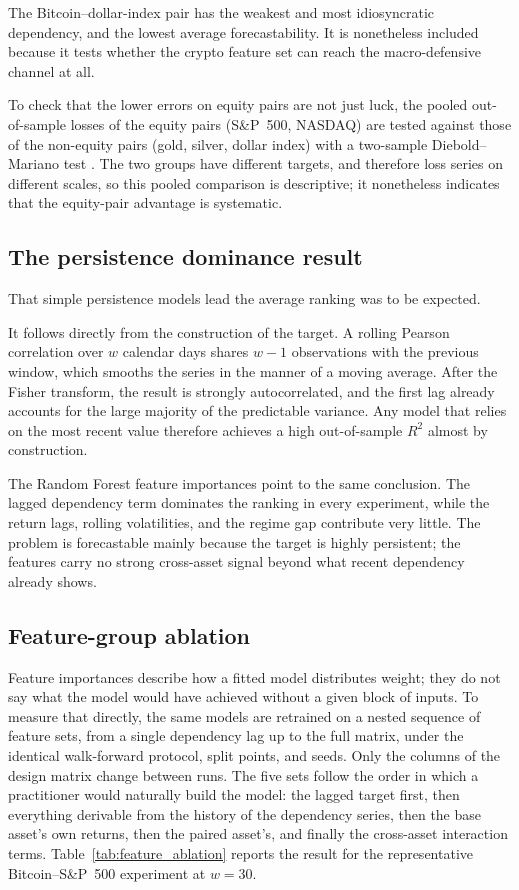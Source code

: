 The Bitcoin--dollar-index pair has the weakest and most idiosyncratic dependency, and the lowest average forecastability. It is nonetheless included because it tests whether the crypto feature set can reach the macro-defensive channel at all.

To check that the lower errors on equity pairs are not just luck, the pooled out-of-sample losses of the equity pairs (S\&P~500, NASDAQ) are tested against those of the non-equity pairs (gold, silver, dollar index) with a two-sample Diebold--Mariano test \cite{diebold1995}. The two groups have different targets, and therefore loss series on different scales, so this pooled comparison is descriptive; it nonetheless indicates that the equity-pair advantage is systematic.

\subsection{The persistence dominance result}

That simple persistence models lead the average ranking was to be expected.

It follows directly from the construction of the target. A rolling Pearson correlation over $w$ calendar days shares $w-1$ observations with the previous window, which smooths the series in the manner of a moving average. After the Fisher transform, the result is strongly autocorrelated, and the first lag already accounts for the large majority of the predictable variance. Any model that relies on the most recent value therefore achieves a high out-of-sample $R^2$ almost by construction.

The Random Forest feature importances point to the same conclusion. The lagged dependency term dominates the ranking in every experiment, while the return lags, rolling volatilities, and the regime gap contribute very little. The problem is forecastable mainly because the target is highly persistent; the features carry no strong cross-asset signal beyond what recent dependency already shows.

\subsection{Feature-group ablation}
\label{sec:ablation}

Feature importances describe how a fitted model distributes weight; they do not say what the model would have achieved without a given block of inputs. To measure that directly, the same models are retrained on a nested sequence of feature sets, from a single dependency lag up to the full matrix, under the identical walk-forward protocol, split points, and seeds. Only the columns of the design matrix change between runs. The five sets follow the order in which a practitioner would naturally build the model: the lagged target first, then everything derivable from the history of the dependency series, then the base asset's own returns, then the paired asset's, and finally the cross-asset interaction terms. Table~\ref{tab:feature_ablation} reports the result for the representative Bitcoin--S\&P~500 experiment at $w = 30$.

